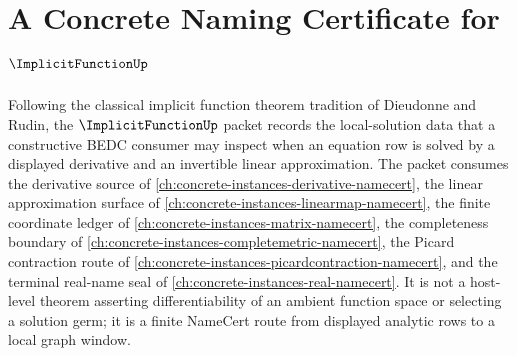 \chapter{A Concrete Naming Certificate for $\ImplicitFunctionUp$}
\label{ch:concrete-instances-implicitfunction-namecert}

Following the classical implicit function theorem tradition of Dieudonne and Rudin, the $\ImplicitFunctionUp$ packet records the local-solution data that a constructive BEDC consumer may inspect when an equation row is solved by a displayed derivative and an invertible linear approximation. The packet consumes the derivative source of \autoref{ch:concrete-instances-derivative-namecert}, the linear approximation surface of \autoref{ch:concrete-instances-linearmap-namecert}, the finite coordinate ledger of \autoref{ch:concrete-instances-matrix-namecert}, the completeness boundary of \autoref{ch:concrete-instances-completemetric-namecert}, the Picard contraction route of \autoref{ch:concrete-instances-picardcontraction-namecert}, and the terminal real-name seal of \autoref{ch:concrete-instances-real-namecert}. It is not a host-level theorem asserting differentiability of an ambient function space or selecting a solution germ; it is a finite NameCert route from displayed analytic rows to a local graph window.

